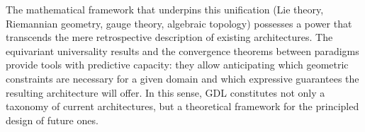 The mathematical framework that underpins this unification (Lie theory, Riemannian geometry, gauge theory, algebraic topology) possesses a power that transcends the mere retrospective description of existing architectures. The equivariant universality results and the convergence theorems between paradigms provide tools with predictive capacity: they allow anticipating which geometric constraints are necessary for a given domain and which expressive guarantees the resulting architecture will offer. In this sense, \gls{GDL} constitutes not only a taxonomy of current architectures, but a theoretical framework for the principled design of future ones.
